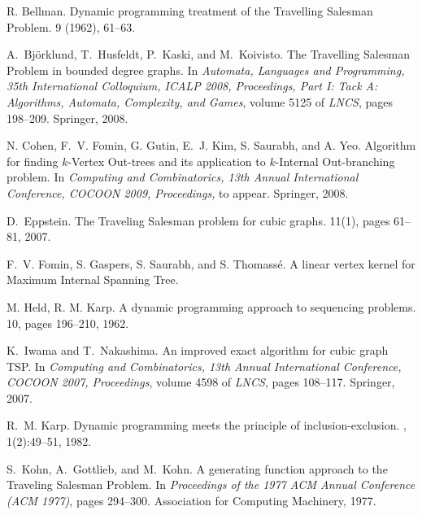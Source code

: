 \documentclass{llncs}
\newcommand{\longversion}[1]{#1}
\begin{document}
\begin{thebibliography}{1}
R. Bellman.
\newblock Dynamic programming treatment of the Travelling Salesman Problem.
 9 (1962), 61--63.

A.~Bj{\"o}rklund, T.~Husfeldt, P.~Kaski, and M.~Koivisto.
\newblock The Travelling Salesman Problem in bounded degree graphs.
\newblock In {\em\longversion{Automata, Languages and Programming, 35th International Colloquium,}
  ICALP 2008, \longversion{Proceedings,} Part I\longversion{: Tack A:
  Algorithms, Automata, Complexity, and Games}}, volume 5125 of {\em LNCS}, pages 198--209. Springer, 2008.
  
N. Cohen, F.~V. Fomin, G. Gutin, E.~J. Kim, S. Saurabh, and A. Yeo.
\newblock Algorithm for finding $k$-Vertex Out-trees and its application to $k$-Internal Out-branching problem.
\newblock In {\em\longversion{Computing and Combinatorics, 13th Annual International Conference,}
  COCOON 2009, \longversion{Proceedings,}} to appear. Springer, 2008.

D.~Eppstein.
\newblock The Traveling Salesman problem for cubic graphs.
 11(1), pages 61--81, 2007.

F.~V. Fomin, S. Gaspers, S. Saurabh, and S. Thomass{\'e}.
\newblock A linear vertex kernel for Maximum Internal Spanning Tree.

M. Held, R. M. Karp. 
\newblock A dynamic programming approach to sequencing problems.
 10, pages 196--210, 1962.



K.~Iwama and T.~Nakashima.
\newblock An improved exact algorithm for cubic graph TSP.
\newblock In {\em\longversion{ Computing and Combinatorics, 13th Annual
  International Conference,} COCOON 2007\longversion{,
  Proceedings}}, volume 4598 of {\em LNCS}, pages
  108--117. Springer, 2007.

R.~M. Karp.
\newblock Dynamic programming meets the principle of inclusion-exclusion.
, 1(2):49--51, 1982.

S.~Kohn, A.~Gottlieb, and M.~Kohn.
\newblock A generating function approach to the Traveling Salesman Problem.
\newblock In {\em Proceedings of the 1977 ACM Annual Conference (ACM 1977)}, pages
  294--300. Association for Computing Machinery, 1977.
  

\end{thebibliography}
\end{document}
